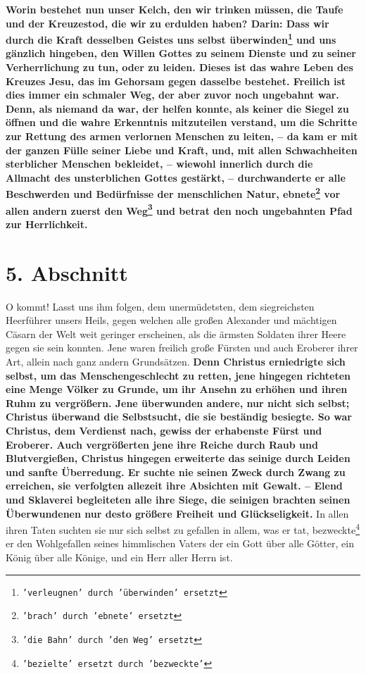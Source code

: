 \label{ref:04_04_kelch_taufe_kreuz}
 
\textbf{Worin bestehet nun unser Kelch, den wir trinken müssen, die Taufe und
der
Kreuzestod, die wir zu erdulden haben? Darin: Dass wir durch die Kraft desselben
Geistes uns selbst überwinden\footnote{\texttt{'verleugnen' durch 'überwinden'
ersetzt}} und uns gänzlich hingeben, den Willen Gottes zu
seinem Dienste und zu seiner Verherrlichung zu tun, oder zu leiden. Dieses ist
das wahre Leben des Kreuzes Jesu, das im Gehorsam gegen dasselbe bestehet.
Freilich ist dies immer ein schmaler Weg, der aber zuvor noch ungebahnt war.
Denn, als
niemand da war, der helfen konnte, als keiner die Siegel  zu
öffnen und die wahre
Erkenntnis mitzuteilen verstand, um die Schritte zur Rettung des armen
verlornen Menschen zu leiten, -- da kam er mit der ganzen Fülle seiner Liebe und
Kraft, und, mit allen Schwachheiten sterblicher Menschen bekleidet, -- wiewohl
innerlich durch die Allmacht  des unsterblichen
Gottes
gestärkt, -- durchwanderte
er alle Beschwerden und Bedürfnisse der menschlichen Natur,
ebnete\footnote{\texttt{'brach' durch 'ebnete' ersetzt}} vor allen
andern zuerst den Weg\footnote{\texttt{'die Bahn' durch 'den Weg' ersetzt}} und
betrat den noch ungebahnten Pfad zur Herrlichkeit.}

\section{5. Abschnitt} \label{kap4_ab5}

\label{ref:04_05_besigen}
O kommt! Lasst uns ihm folgen, dem unermüdetsten, dem siegreichsten Heerführer
unsers Heils, gegen welchen alle großen Alexander 
und mächtigen Cäsarn der Welt 
weit geringer erscheinen, als die ärmsten Soldaten ihrer Heere
 gegen sie sein
konnten. Jene waren freilich große Fürsten und auch Eroberer
 ihrer Art, allein
nach ganz andern Grundsätzen. \textbf{Denn Christus erniedrigte sich selbst, um
das
Menschengeschlecht zu retten, jene hingegen richteten eine Menge Völker zu
Grunde, um ihr Ansehn zu erhöhen und ihren Ruhm zu vergrößern. Jene überwunden
andere, nur nicht sich selbst; Christus überwand die Selbstsucht, die sie
beständig besiegte. So war Christus, dem Verdienst nach, gewiss der erhabenste
Fürst und Eroberer. Auch vergrößerten jene ihre Reiche durch Raub und
Blutvergießen, Christus hingegen erweiterte das seinige durch Leiden und sanfte
Überredung. Er suchte nie seinen Zweck durch Zwang zu erreichen, sie verfolgten
allezeit ihre Absichten mit Gewalt. -- Elend und Sklaverei begleiteten alle ihre
Siege, die seinigen brachten seinen Überwundenen nur desto größere Freiheit und
Glückseligkeit.} In allen ihren Taten suchten sie nur sich selbst zu gefallen
in allem, was er tat, bezweckte\footnote{\texttt{'bezielte' ersetzt durch
'bezweckte'}}
er den Wohlgefallen seines himmlischen Vaters
der ein Gott über alle Götter, ein König über alle Könige, und ein Herr aller
Herrn ist.

